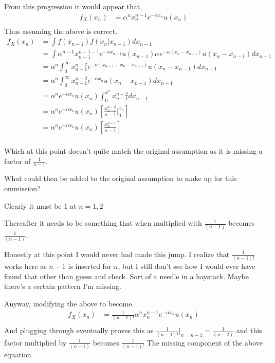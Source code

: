 \documentclass[12pt]{article}
\begin{document}
\begin{enumerate}[label=(\alph*)]
From this progression it would appear that.
\begin{align*}
  f_X(x_n)&=\alpha^n x_n^{n-1} e^{-\alpha x_n}u(x_n)\\
\end{align*}
Thus assuming the above is correct.
\begin{align*}
  f_X(x_n)&=\int f(x_{n-1})f(x_n|x_{n-1}) dx_{n-1}\\
  &=\int \alpha^{n-1} x_{n-1}^{n-1-1} e^{-\alpha x_{n-1}}u(x_{n-1})  \alpha e^{-\alpha(x_n-x_{n-1})}u(x_n-x_{n-1})    dx_{n-1}\\
  &=\alpha^n \int_{0}^{\infty}  x_{n-1}^{n-2} e^{-\alpha (x_{n-1} + x_n-x_{n-1})}u(x_n-x_{n-1})    dx_{n-1}\\
  &=\alpha^n \int_{0}^{\infty}  x_{n-1}^{n-2} e^{-\alpha x_n}u(x_n-x_{n-1})    dx_{n-1}\\
  &=\alpha^n e^{-\alpha x_n}u(x_n)\int_{0}^{x^n}  x_{n-1}^{n-2}   dx_{n-1}\\
  &=\alpha^n e^{-\alpha x_n}u(x_n)\left[\frac{x_{n-1}^{n-2}}{n-1}  \big|_0^{x_n}\right]\\
  &=\alpha^n e^{-\alpha x_n}u(x_n)\left[\frac{x_n^{n-1}}{n-1}\right]\\
\end{align*}
\end{enumerate}

Which at this point doesn't quite match the original assumption as it is missing a factor of $\frac{1}{n-1}$.

What could then be added to the original assumption to make up for this ommission?

Clearly it must be 1 at $n=1,2$

Thereafter it needs to be something that when multiplied with $\frac{1}{(n-1)}$ becomes $\frac{1}{(n-1)}$.

Honestly at this point I would never had made this jump. I realize that $\frac{1}{(n-1)!}$ works here as $n-1$ is inserted for $n$, but I still don't see how I would ever have 
found that other than guess and check. Sort of a needle in a haystack. Maybe there's a certain pattern I'm missing.

Anyway, modifying the above to become.
\begin{align*}
  f_X(x_n)&=\frac{1}{(n-1)!}\alpha^n x_n^{n-1} e^{-\alpha x_n}u(x_n)\\
\end{align*}
And plugging through eventually proves this as $\frac{1}{(n-1)!}\big|_{n=n-1}=\frac{1}{(n-2)} $ and this factor multiplied by $\frac{1}{(n-1)}$ becomes $\frac{1}{(n-1)!}$ The 
missing component of the above equation.
\newpage
\end{document}
